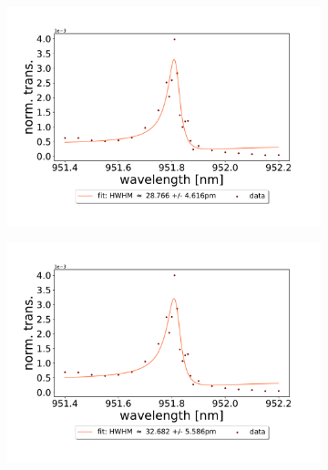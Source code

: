 \begin{figure}[h!]
    \centering
    \begin{subfigure}[b]{0.49\textwidth}
        \includegraphics[width=\textwidth]{figures/results/single fano fits/5um_M5_fit_1.pdf}
        \caption{}
        \label{fig:5um_M5_fit_1}
    \end{subfigure}
    \begin{subfigure}[b]{0.49\textwidth}
        \includegraphics[width=\textwidth]{figures/results/single fano fits/5um_M5_fit_2.pdf}
        \caption{}
        \label{fig:5um_M5_fit_2}
    \end{subfigure}
    \begin{subfigure}[b]{0.49\textwidth}

\end{subfigure}
\end{figure}
